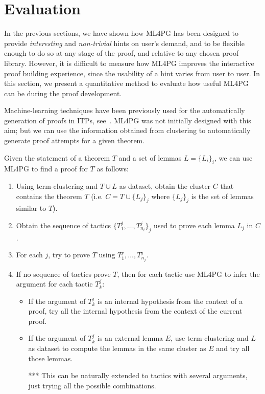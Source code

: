 \section{Evaluation}\label{sec:evaluation}

In the previous sections, we have shown how ML4PG has been designed to provide \emph{interesting} and \emph{non-trivial} hints on user's demand,
and to be flexible enough to do so at any stage of the proof, and relative to any chosen proof library.
However, it is difficult to measure how ML4PG improves the interactive proof building experience, since
the usability of a hint varies from user to user. In this section, we present a quantitative method to evaluate
how useful ML4PG can be during the proof development.


Machine-learning techniques have been previously used for the automatically generation of proofs in
ITPs, see~\cite{Duncan02,DixonF03,GNR14}. ML4PG was not initially designed with this aim;
but we can use the information obtained from clustering to automatically generate proof attempts for a given theorem.

\begin{PEM}\label{pem}
Given the statement of a theorem $T$ and a set of lemmas $L=\{L_i\}_i$, we can use ML4PG to find a proof for $T$ as follows:
\begin{enumerate}
 \item Using term-clustering and $T\cup L$ as dataset, obtain the cluster $C$ that contains the theorem $T$ (i.e. $C=T\cup \{L_j\}_j$ where $\{L_j\}_j$ is the set of lemmas similar to $T$).
 \item Obtain the sequence of tactics $\{T_1^j,\ldots,T_{n_i}^j\}_{j}$ used to prove each lemma $L_j$ in $C$.
 \item For each $j$, try to prove $T$ using $T_1^j,\ldots,T_{n_j}^j$.
 \item If no sequence of tactics prove $T$, then for each tactic use ML4PG to infer the argument for each tactic $T_k^j$:
    \begin{itemize}
     \item If the argument of $T_k^j$ is an internal hypothesis from the context of a proof, try all the internal hypothesis from the context of the current proof.
     \item If the argument of $T_k^j$ is an external lemma $E$, use term-clustering and $L$ as dataset to compute the lemmas in the same cluster as $E$ and try all those lemmas.
     \item[***] This can be naturally extended to tactics with several arguments, just trying all the possible combinations.
  \end{itemize}
\end{enumerate}
\end{PEM}

